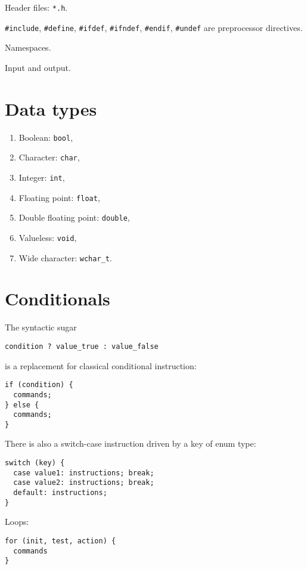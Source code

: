 \documentclass{programmingnotes}
\begin{document}
\renewcommand{\footrulewidth}{0.4pt}
\begin{multicols*}{3}

Header files: \texttt{*.h}.

\texttt{#include}, \texttt{#define}, \texttt{#ifdef}, \texttt{#ifndef}, \texttt{#endif}, \texttt{#undef} are preprocessor directives.

Namespaces.

Input and output.

\section{Data types}
\begin{enumerate}
\item Boolean: \texttt{bool}, 
\item Character: \texttt{char}, 
\item Integer: \texttt{int}, 
\item Floating point: \texttt{float}, 
\item Double floating point: \texttt{double}, 
\item Valueless: \texttt{void}, 
\item Wide character: \texttt{wchar\_t}.
\end{enumerate}

\section{Conditionals}
The syntactic sugar
\begin{verbatim}
condition ? value_true : value_false
\end{verbatim}
is a replacement for classical conditional instruction:
\begin{verbatim}
if (condition) {
  commands;
} else {
  commands;
}
\end{verbatim}

There is also a switch-case instruction driven by a key of enum type:
\begin{verbatim}
switch (key) {
  case value1: instructions; break;
  case value2: instructions; break;
  default: instructions;
}
\end{verbatim}

Loops:
\begin{verbatim}
for (init, test, action) {
  commands
}
\end{verbatim}


\end{multicols*}
\end{document}
